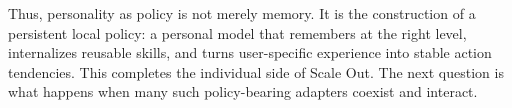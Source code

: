 



Thus, personality as policy is not merely memory. It is the construction of a persistent local policy: a personal model that remembers at the right level, internalizes reusable skills, and turns user-specific experience into stable action tendencies. This completes the individual side of Scale Out. The next question is what happens when many such policy-bearing adapters coexist and interact.

